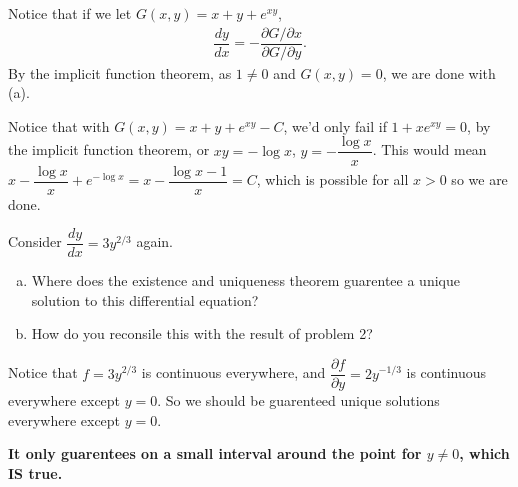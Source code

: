 \documentclass{article}
\begin{document}
\begin{solution}[Problem 3a]
    Notice that if we let $G(x,y) = x + y + e^{xy}$,
    \begin{align*}
        \dfrac{dy}{dx} = - \dfrac{\partial G / \partial x}{\partial G / \partial y}.
    \end{align*}
        By the implicit function theorem, as $1 \ne 0$ and $G(x, y) = 0$, we are done with (a). 
\end{solution}
\begin{solution}[Problem 3b]
    Notice that with $G(x,y) =x + y + e^{xy} -C$, we'd only fail if $1+xe^{xy} = 0$, by the 
    implicit function theorem, or $xy = - \log x$, $y = -\dfrac{\log x}{x}$. This would mean $x -\dfrac{\log x}{x} + e^{- \log x} = x - \dfrac{\log x - 1}{x} = C$,
    which is possible for all $x> 0$ so we are done.
\end{solution}
\begin{problem}
    Consider $\dfrac{dy}{dx}=3y^{2/3}$ again.
    \begin{enumerate}[(a)]
        \item Where does the existence and uniqueness theorem guarentee a unique solution to this
        differential equation?
        \item How do you reconsile this with the result of problem 2?
    \end{enumerate}
\end{problem}
\begin{solution}[Problem 4a]
    Notice that $f=3y^{2/3}$ is continuous everywhere, and $\dfrac{\partial f}{\partial y} = 2y^{-1/3}$ is continuous everywhere except
    $y=0$. So we should be guarenteed unique solutions everywhere except $y=0$. 
\end{solution}
\begin{solution}[Problem 4b]
    \textbf{It only guarentees on a small interval around the point for $y \ne 0$, which IS true.}
\end{solution}
\end{document}
